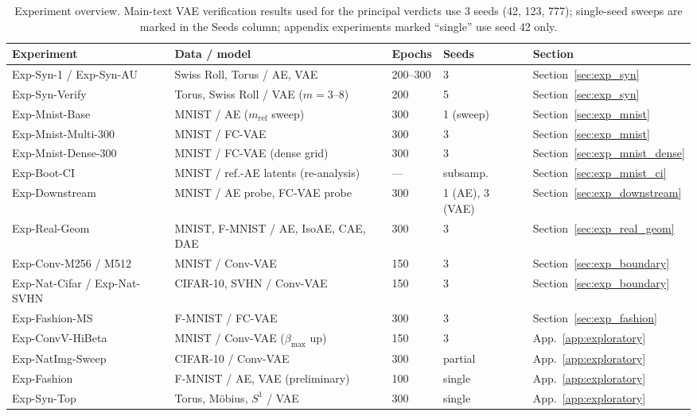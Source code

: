 \documentclass[make,article,submit,pdftex,moreauthors]{Definitions/mdpi}
\begin{document}
\begin{table}[H]
\caption{Experiment overview. Main-text VAE verification results used for
the principal verdicts use 3 seeds (42, 123, 777); single-seed sweeps are
marked in the Seeds column; appendix experiments marked ``single'' use
seed 42 only.}
\label{tab:exp_list}
\small
\begin{tabular}{p{3.2cm}p{3.4cm}p{1.4cm}p{1.2cm}p{2.4cm}}
\toprule
\textbf{Experiment} & \textbf{Data / model} & \textbf{Epochs} & \textbf{Seeds} & \textbf{Section} \\
\midrule
Exp-Syn-1 / Exp-Syn-AU & Swiss Roll, Torus / AE, VAE & 200--300 & 3 & Section~\ref{sec:exp_syn} \\
Exp-Syn-Verify & Torus, Swiss Roll / VAE ($m = 3$--$8$) & 200 & 5 & Section~\ref{sec:exp_syn} \\
Exp-Mnist-Base & MNIST / AE ($m_{\mathrm{ref}}$ sweep) & 300 & 1 (sweep) & Section~\ref{sec:exp_mnist} \\
Exp-Mnist-Multi-300 & MNIST / FC-VAE & 300 & 3 & Section~\ref{sec:exp_mnist} \\
Exp-Mnist-Dense-300 & MNIST / FC-VAE (dense grid) & 300 & 3 & Section~\ref{sec:exp_mnist_dense} \\
Exp-Boot-CI & MNIST / ref.-AE latents (re-analysis) & --- & subsamp. & Section~\ref{sec:exp_mnist_ci} \\
Exp-Downstream & MNIST / AE probe, FC-VAE probe & 300 & 1 (AE), 3 (VAE) & Section~\ref{sec:exp_downstream} \\
Exp-Real-Geom & MNIST, F-MNIST / AE, IsoAE, CAE, DAE & 300 & 3 & Section~\ref{sec:exp_real_geom} \\
Exp-Conv-M256 / M512 & MNIST / Conv-VAE & 150 & 3 & Section~\ref{sec:exp_boundary} \\
Exp-Nat-Cifar / Exp-Nat-SVHN & CIFAR-10, SVHN / Conv-VAE & 150 & 3 & Section~\ref{sec:exp_boundary} \\
Exp-Fashion-MS & F-MNIST / FC-VAE & 300 & 3 & Section~\ref{sec:exp_fashion} \\
Exp-ConvV-HiBeta & MNIST / Conv-VAE ($\beta_{\max}$ up) & 150 & 3 & App.~\ref{app:exploratory} \\
Exp-NatImg-Sweep & CIFAR-10 / Conv-VAE & 300 & partial & App.~\ref{app:exploratory} \\
Exp-Fashion & F-MNIST / AE, VAE (preliminary) & 100 & single & App.~\ref{app:exploratory} \\
Exp-Syn-Top & Torus, M\"obius, $S^1$ / VAE & 300 & single & App.~\ref{app:exploratory} \\
\bottomrule
\end{tabular}
\end{table}
\end{document}
